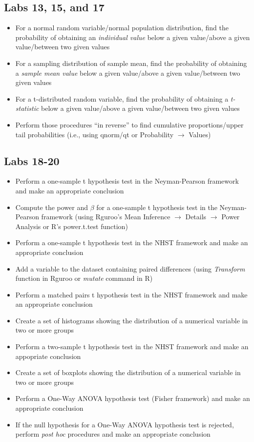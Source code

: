 \documentclass[11pt]{article} %
\begin{document}
\subsection{Labs 13, 15, and 17}
\begin{itemize}
\item For a normal random variable/normal population distribution, find the probability of obtaining an \emph{individual value} below a given value/above a given value/between two given values
\item For a sampling distribution of sample mean, find the probability of obtaining a \emph{sample mean value} below a given value/above a given value/between two given values
\item For a t-distributed random variable, find the probability of obtaining a \emph{t-statistic} below a given value/above a given value/between two given values
\item Perform those procedures ``in reverse'' to find cumulative proportions/upper tail probabilities (i.e., using qnorm/qt or Probability $\rightarrow$ Values)
\end{itemize}


\subsection{Labs 18-20}

\begin{itemize}
\item Perform a one-sample t hypothesis test in the Neyman-Pearson framework and make an appropriate conclusion
\item Compute the power and $\beta$ for a one-sample t hypothesis test in the Neyman-Pearson framework (using Rguroo's Mean Inference $\rightarrow$ Details $\rightarrow$ Power Analysis or R's power.t.test function)
\item Perform a one-sample t hypothesis test in the NHST framework and make an appropriate conclusion
\item Add a variable to the dataset containing paired differences (using \emph{Transform} function in Rguroo or \emph{mutate} command in R)
\item Perform a matched pairs t hypothesis test in the NHST framework and make an appropriate conclusion
\item Create a set of histograms showing the distribution of a numerical variable in two or more groups
\item Perform a two-sample t hypothesis test in the NHST framework and make an appopriate conclusion
\item Create a set of boxplots showing the distribution of a numerical variable in two or more groups
\item Perform a One-Way ANOVA hypothesis test (Fisher framework) and make an appropriate conclusion
\item If the null hypothesis for a One-Way ANOVA hypothesis test is rejected, perform \emph{post hoc} procedures and make an appropriate conclusion
\end{itemize}
\end{document}
